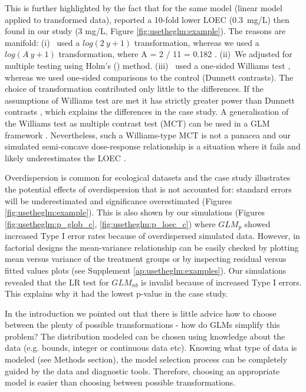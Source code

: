 This is further highlighted by the fact that for the same model (linear model applied to transformed data), \citet{brock_minimum_2015} reported a 10-fold lower LOEC (\mbox{0.3 mg/L}) then found in our study (3 mg/L, Figure \ref{fig:usetheglm:example}).
The reasons are manifold: 
(i)~\citet{brock_minimum_2015} used a $log(2~y + 1)$ transformation, whereas we used a $log(A~y + 1)$ transformation, where A = 2 / 11 = 0.182 \citep{van_den_brink_impact_2000}.
(ii)~We adjusted for multiple testing using Holm's (\citeyear{holm_simple_1979}) method.
(iii)~\citet{brock_minimum_2015} used a one-sided Williams test \citep{williams_comparison_1972}, whereas we used one-sided comparisons to the control (Dunnett contrasts).
The choice of transformation contributed only little to the differences. 
If the assumptions of Williams test  are met it has strictly greater power than Dunnett contrasts \citep{jaki_statistical_2013}, which explains the differences in the case study.
A generalisation of the Williams test as multiple contrast test (MCT) can be used in a GLM framework \citep{hothorn_simultaneous_2008}.
Nevertheless, such a Williams-type MCT is not a panacea \citep{hothorn_statistical_2014} and our simulated semi-concave dose-response relationship is a situation where it fails and likely underestimates the LOEC \citep{kuiper_identification_2014}. 
 

Overdispersion is common for ecological datasets \citep{warton_many_2005} and the case study illustrates the potential effects of overdispersion that is not accounted for: standard errors will be underestimated and significance overestimated (Figures \ref{fig:usetheglm:example}).
This is also shown by our simulations (Figures \ref{fig:usetheglm:p_glob_c}, \ref{fig:usetheglm:p_loec_c}) where $GLM_p$ showed increased Type I error rates because of overdispersed simulated data. 
However, in factorial designs the mean-variance relationship can be easily \newline 
checked by plotting mean versus variance of the treatment groups or by inspecting residual versus fitted values plots (see Supplement \ref{ap:usetheglm:examples}).
Our simulations revealed that the LR test for $GLM_{nb}$ is invalid because of increased Type I errors. This explains why it had the lowest p-value in the case study.

In the introduction we pointed out that there is little advice how to choose between the plenty of possible transformations - how do GLMs simplify this problem?
The distribution modeled can be chosen using knowledge about the data (e.g. bounds, integer or continuous data etc).
Knowing what type of data is modeled (see Methods section), the model selection process can be completely guided by the data and diagnostic tools. Therefore, choosing an appropriate model is easier than choosing between possible transformations.


